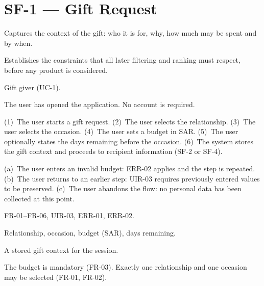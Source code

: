\documentclass[11pt,a4paper]{report}
\begin{document}
\section{SF-1 --- Gift Request}
\begin{description}[style=nextline,leftmargin=0pt]
\item[Description] Captures the context of the gift: who it is for, why, how much may be spent and by when.
\item[Purpose] Establishes the constraints that all later filtering and ranking must respect, before any product is considered.
\item[Actors] Gift giver (UC-1).
\item[Preconditions] The user has opened the application. No account is required.
\item[Main flow] (1)~The user starts a gift request. (2)~The user selects the relationship. (3)~The user selects the occasion. (4)~The user sets a budget in SAR. (5)~The user optionally states the days remaining before the occasion. (6)~The system stores the gift context and proceeds to recipient information (SF-2 or SF-4).
\item[Alternative and exception flows] (a)~The user enters an invalid budget: ERR-02 applies and the step is repeated. (b)~The user returns to an earlier step: UIR-03 requires previously entered values to be preserved. (c)~The user abandons the flow: no personal data has been collected at this point.
\item[Requirements] FR-01--FR-06, UIR-03, ERR-01, ERR-02.
\item[Inputs] Relationship, occasion, budget (SAR), days remaining.
\item[Outputs] A stored gift context for the session.
\item[Constraints] The budget is mandatory (FR-03). Exactly one relationship and one occasion may be selected (FR-01, FR-02).
\end{description}
\end{document}
